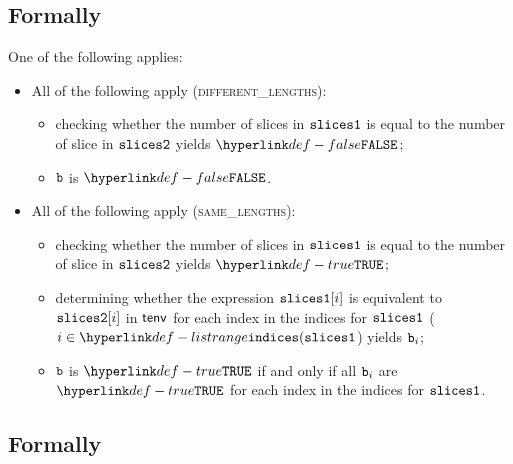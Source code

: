 \subsection{Formally}
One of the following applies:
\begin{itemize}
  \item All of the following apply (\textsc{different\_lengths}):
  \begin{itemize}
    \item checking whether the number of slices in $\texttt{slices1}$ is equal to the number of slice in $\texttt{slices2}$ yields $\False$;
    \item $\texttt{b}$ is $\False$.
  \end{itemize}

  \item All of the following apply (\textsc{same\_lengths}):
  \begin{itemize}
    \item checking whether the number of slices in $\texttt{slices1}$ is equal to the number of slice in $\texttt{slices2}$ yields $\True$;
    \item determining whether the expression $\texttt{slices1}[i]$ is equivalent to $\texttt{slices2}[i]$ in $\textsf{tenv}$
          for each index in the indices for $\texttt{slices1}$ ($i \in \listrange(\slicesone$) yields $\texttt{b}_i$\ProseOrTypeError;
    \item $\texttt{b}$ is $\True$ if and only if all $\texttt{b}_i$ are $\True$ for each index in the indices for $\texttt{slices1}$.
  \end{itemize}
\end{itemize}

\subsection{Formally}

